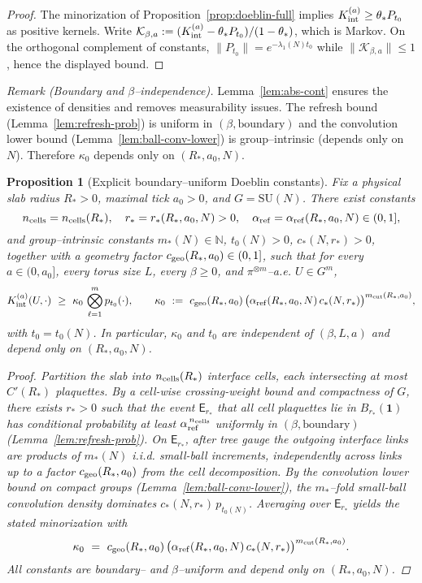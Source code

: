 \documentclass[11pt]{amsart}
\theoremstyle{plain}
\newtheorem{proposition}[theorem]{Proposition}
\theoremstyle{definition}
\theoremstyle{remark}
\begin{document}
\begin{proof}
The minorization of Proposition~\ref{prop:doeblin-full} implies $K_{\rm int}^{(a)}\ge \theta_* P_{t_0}$ as positive kernels. Write $\mathcal{K}_{\beta,a}:=(K_{\rm int}^{(a)}-\theta_* P_{t_0})/(1-\theta_*)$, which is Markov. On the orthogonal complement of constants, $\|P_{t_0}\|=e^{-\lambda_1(N) t_0}$ while $\|\mathcal{K}_{\beta,a}\|\le 1$, hence the displayed bound.
\end{proof}

\noindent\emph{Remark (Boundary and $\beta$–independence).} Lemma~\ref{lem:abs-cont} ensures the existence of densities and removes measurability issues. The refresh bound (Lemma~\ref{lem:refresh-prob}) is uniform in $(\beta,\text{boundary})$ and the convolution lower bound (Lemma~\ref{lem:ball-conv-lower}) is group–intrinsic (depends only on $N$). Therefore $\kappa_0$ depends only on $(R_*,a_0,N)$.

\begin{proposition}[Explicit boundary–uniform Doeblin constants]\label{prop:explicit-doeblin-constants}
Fix a physical slab radius $R_*>0$, maximal tick $a_0>0$, and $G=\mathrm{SU}(N)$. There exist constants
\[
  n_{\rm cells}=n_{\rm cells}(R_*),\quad r_*=r_*(R_*,a_0,N)>0,\quad \alpha_{\rm ref}=\alpha_{\rm ref}(R_*,a_0,N)\in(0,1],
\]
and group–intrinsic constants $m_*(N)\in\mathbb N$, $t_0(N)>0$, $c_*(N,r_*)>0$, together with a geometry factor $c_{\rm geo}(R_*,a_0)\in(0,1]$, such that for every $a\in(0,a_0]$, every torus size $L$, every $\beta\ge 0$, and $\pi^{\otimes m}$–a.e. $U\in G^m$,
\[
  K_{\rm int}^{(a)}(U,\cdot)\ \ge\ \kappa_0\,\bigotimes_{\ell=1}^m p_{t_0}(\cdot),\qquad
  \kappa_0\ :=\ c_{\rm geo}(R_*,a_0)\,\big(\alpha_{\rm ref}(R_*,a_0,N)\,c_*(N,r_*)\big)^{m_{\rm cut}(R_*,a_0)},
\]
with $t_0=t_0(N)$. In particular, $\kappa_0$ and $t_0$ are independent of $(\beta,L,a)$ and depend only on $(R_*,a_0,N)$.

\begin{proof}
Partition the slab into $n_{\rm cells}(R_*)$ interface cells, each intersecting at most $C'(R_*)$ plaquettes. By a cell-wise crossing-weight bound and compactness of $G$, there exists $r_*>0$ such that the event $\mathsf E_{r_*}$ that all cell plaquettes lie in $B_{r_*}(\mathbf 1)$ has conditional probability at least $\alpha_{\rm ref}^{\,n_{\rm cells}}$ uniformly in $(\beta,\text{boundary})$ (Lemma~\ref{lem:refresh-prob}). On $\mathsf E_{r_*}$, after tree gauge the outgoing interface links are products of $m_*(N)$ i.i.d. small-ball increments, independently across links up to a factor $c_{\rm geo}(R_*,a_0)$ from the cell decomposition. By the convolution lower bound on compact groups (Lemma~\ref{lem:ball-conv-lower}), the $m_*$–fold small-ball convolution density dominates $c_*(N,r_*)\,p_{t_0(N)}$. Averaging over $\mathsf E_{r_*}$ yields the stated minorization with
\[
  \kappa_0\ =\ c_{\rm geo}(R_*,a_0)\,\big(\alpha_{\rm ref}(R_*,a_0,N)\,c_*(N,r_*)\big)^{m_{\rm cut}(R_*,a_0)}.
\]
All constants are boundary– and $\beta$–uniform and depend only on $(R_*,a_0,N)$.
\end{proof}
\end{proposition}
\end{document}
